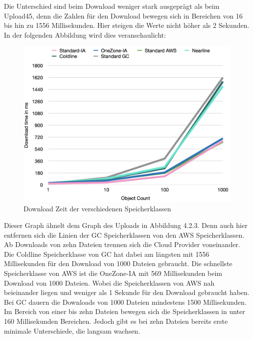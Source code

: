 \newpage

Die Unterschied sind beim Download weniger stark ausgeprägt als beim Upload45, denn die Zahlen für den Download bewegen sich in Bereichen von 16 bis hin zu 1556 Millisekunden. Hier steigen die Werte nicht höher als 2 Sekunden. In der folgenden Abbildung wird dies veranschaulicht:

\begin{figure}[h]
	\centering
	\includegraphics[width=14cm,keepaspectratio]{Pictures/DownloadTime.png}
	\caption{Download Zeit der verschiedenen Speicherklassen}
\end{figure}

Dieser Graph ähnelt dem Graph des Uploads in Abbildung 4.2.3. Denn auch hier entfernen sich die Linien der GC Speicherklassen von den AWS Speicherklassen. Ab Downloads von zehn Dateien trennen sich die Cloud Provider voneinander. Die Coldline Speicherklasse von GC hat dabei am längsten mit 1556 Millisekunden für den Download von 1000 Dateien gebraucht. Die schnellste Speicherklasse von AWS ist die OneZone-IA mit 569 Millisekunden beim Download von 1000 Dateien. Wobei die Speicherklassen von AWS nah beieinander liegen und weniger als 1 Sekunde für den Download gebraucht haben. Bei GC dauern die Downloads von 1000 Dateien mindestens 1500 Millisekunden. Im Bereich von einer bis zehn Dateien bewegen sich die Speicherklassen in unter 160 Millisekunden Bereichen. Jedoch gibt es bei zehn Dateien bereits erste minimale Unterschiede, die langsam wachsen.\\
 